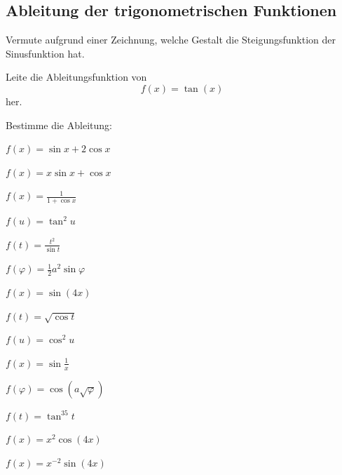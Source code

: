 \documentclass[%
11pt,%
twoside,%
titlepage,%
german,%
headsepline%
]{scrartcl}
\begin{document}
\subsection{Ableitung der trigonometrischen Funktionen}
\begin{ueb}[Trigoableitungen]
Vermute
aufgrund einer Zeichnung, welche Gestalt die Steigungsfunktion der Sinusfunktion hat.
\end{ueb}

\begin{ueb}
Leite
die Ableitungsfunktion von
$$f(x)=\tan(x)$$
her.
\end{ueb}

\begin{ueb}
Bestimme die Ableitung:

\begin{minipage}{0.4\textwidth}
\begin{enumeratea}
\item $f(x)=\sin x+2\cos x$
\item $f(x)=x\sin x+\cos x$
\item $f(x)=\frac{1}{1+\cos x}$
\item $f(u)=\tan^2u$
\item $f(t)=\frac{t^2}{\sin t}$
\item $f(\varphi)=\frac{1}{2}a^2\sin\varphi$
\item $f(x)=\sin(4x)$
\end{enumeratea}
\end{minipage}
\begin{minipage}{3.9cm}
\begin{enumeratea}
\addtocounter{enumi}{7}
\item $f(t)=\sqrt{\cos t}$
\item $f(u)=\cos^2u$
\item $f(x)=\sin\frac{1}{x}$
\item $f(\varphi)=\cos (a\sqrt{\varphi})$
\item $f(t)=\tan^35t$
\item $f(x)=x^2\cos(4x)$
\item $f(x)=x^{-2}\sin(4x)$
\end{enumeratea}
\end{minipage}
\end{ueb}
\end{document}

